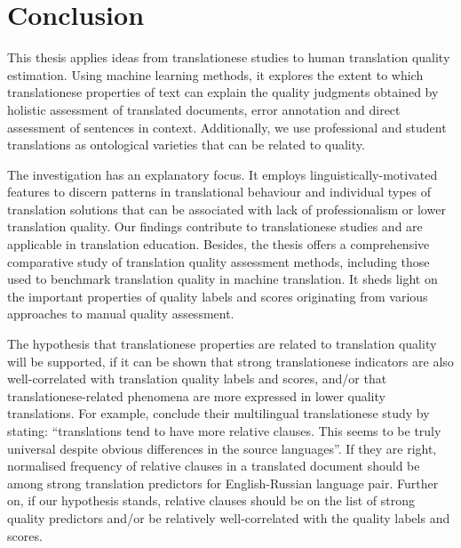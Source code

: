 \chapter{\label{cha:fin}Conclusion}
This thesis applies ideas from translationese studies to human translation quality estimation. 
Using machine learning methods, it explores the extent to which translationese properties of text can explain the quality judgments obtained by holistic assessment of translated documents, error annotation and direct assessment of sentences in context. Additionally, we use professional and student translations as ontological varieties that can be related to quality. 

The investigation has an explanatory focus. It employs linguistically-motivated features to discern patterns in translational behaviour and individual types of translation solutions that can be associated with lack of professionalism or lower translation quality. Our findings contribute to translationese studies and are applicable in translation education. 
Besides, the thesis offers a comprehensive comparative study of translation quality assessment methods, including those used to benchmark translation quality in machine translation. It sheds light on the important properties of quality labels and scores originating from various approaches to manual quality assessment. 

The hypothesis that translationese properties are related to translation quality will be supported, if it can be shown that strong translationese indicators are also well-correlated with translation quality labels and scores, and/or that translationese-related phenomena are more expressed in lower quality translations. For example, \citet[][p.357]{Hu2021} conclude their multilingual translationese study by stating: ``translations tend to have more relative clauses. This seems to be truly universal despite obvious differences in the source languages''. If they are right, normalised frequency of relative clauses in a translated document should be among strong translation predictors for English-Russian language pair. Further on, if our hypothesis stands, relative clauses should be on the list of strong quality predictors and/or be relatively well-correlated with the quality labels and scores. 

